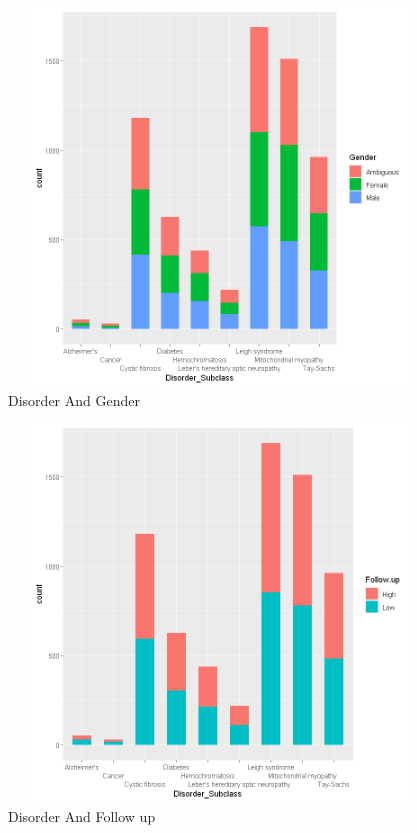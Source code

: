 \begin{figure}[htpb]
	\centering
	\includegraphics[height=10cm, width=12cm]{figures/gender.png}
	\caption{Disorder And Gender}
	\label{fig 7}
\end{figure}

\begin{figure}[htpb]
	\centering
	\includegraphics[height=10cm, width=12cm]{figures/follow.png}
	\caption{Disorder And Follow up}
	\label{fig 8}
\end{figure}

